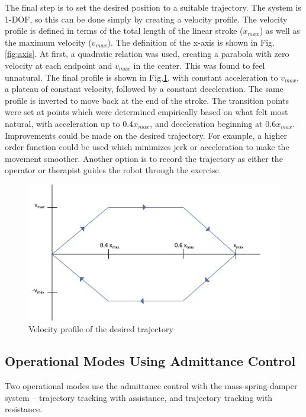 \documentclass[12pt]{report}
\begin{document}
	The final step is to set the desired position to a suitable trajectory. The system is 1-DOF, so this can be done simply by creating a velocity profile. The velocity profile is defined in terms of the total length of the linear stroke ($x_{max}$) as well as the maximum velocity ($v_{max}$). The definition of the x-axis is shown in Fig.\ref{fig:axis}. At first, a quadratic relation was used, creating a parabola with zero velocity at each endpoint and $v_{max}$ in the center. This was found to feel unnatural. The final profile is shown in Fig.\ref{fig:velocity_profile}, with constant acceleration to $v_{max}$, a plateau of constant velocity, followed by a constant deceleration. The same profile is inverted to move back at the end of the stroke. The transition points were set at points which were determined empirically based on what felt most natural, with acceleration up to $0.4 x_{max}$, and deceleration beginning at $0.6 x_{max}$. 
	Improvements could be made on the desired trajectory. For example, a higher order function could be used which minimizes jerk or acceleration to make the movement smoother. Another option is to record the trajectory as either the operator or therapist guides the robot through the exercise.
	
	\begin{figure}[h] 
		\centering
		\includegraphics[width=0.75\linewidth]{velocity_profile}
		\caption{Velocity profile of the desired trajectory}
		\label{fig:velocity_profile}
	\end{figure}
	
	
	
	\subsection{Operational Modes Using Admittance Control}
	
	Two operational modes use the admittance control with the mass-spring-damper system -- trajectory tracking with assistance, and trajectory tracking with resistance. 
	
\end{document}
